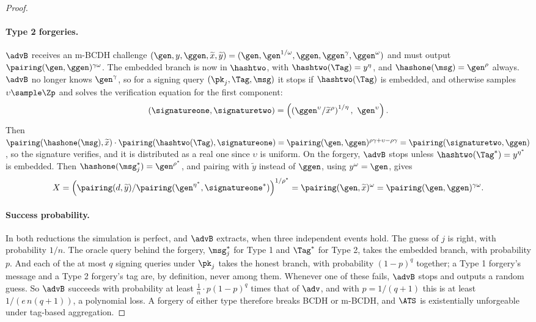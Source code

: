 \begin{proof}
  \paragraph{Type 2 forgeries.} $\advB$ receives an m-BCDH challenge $(\gen, y,
\ggen, \widetilde{x}, \widetilde{y}) = (\gen, \gen^{1/\omega}, \ggen,
\ggen^\gamma, \ggen^\omega)$ and must output $\pairing(\gen,
\ggen)^{\gamma\omega}$. The embedded branch is now in $\hashtwo$, with
$\hashtwo(\Tag) = y^\eta$, and $\hashone(\msg) = \gen^\rho$ always. $\advB$ no longer
knows $\gen^\gamma$, so for a signing query $(\pk_j, \Tag, \msg)$ it stops if
$\hashtwo(\Tag)$ is embedded, and otherwise samples $\upsilon \sample \Zp$ and
solves the verification equation for the first component:
%
\begin{equation*}
  (\signatureone, \signaturetwo) = \left(\left(\ggen^\upsilon /
\widetilde{x}^\rho\right)^{1/\eta}, \ \gen^\upsilon\right).
\end{equation*}
%
Then $\pairing(\hashone(\msg), \widetilde{x}) \cdot \pairing(\hashtwo(\Tag),
\signatureone) = \pairing(\gen, \ggen)^{\rho\gamma + \upsilon - \rho\gamma} =
\pairing(\signaturetwo, \ggen)$, so the signature verifies, and it is distributed
as a real one since $\upsilon$ is uniform. On the forgery, $\advB$ stops unless
$\hashtwo(\Tag^*) = y^{\eta^*}$ is embedded. Then $\hashone(\msg^*_j) =
\gen^{\rho^*}$, and pairing with $\widetilde{y}$ instead of $\ggen$, using
$y^\omega = \gen$, gives
%
\begin{equation*}
  X = \left(\pairing(d, \widetilde{y}) / \pairing(\gen^{\eta^*},
\signatureone^*)\right)^{1/\rho^*} = \pairing(\gen, \widetilde{x})^{\omega} =
\pairing(\gen, \ggen)^{\gamma\omega}.
\end{equation*}

  \paragraph{Success probability.} In both reductions the simulation is perfect,
and $\advB$ extracts, when three independent events hold. The guess of $j$ is
right, with probability $1/n$. The oracle query behind the forgery, $\msg^*_j$ for
Type 1 and $\Tag^*$ for Type 2, takes the embedded branch, with probability $p$.
And each of the at most $q$ signing queries under $\pk_j$ takes the honest branch,
with probability $(1-p)^q$ together; a Type 1 forgery's message and a Type 2
forgery's tag are, by definition, never among them. Whenever one of these fails,
$\advB$ stops and outputs a random guess. So $\advB$ succeeds with probability at
least $\frac{1}{n} \cdot p(1-p)^q$ times that of $\adv$, and with $p = 1/(q+1)$
this is at least $1/(e\,n(q+1))$, a polynomial loss. A forgery of either type
therefore breaks BCDH or m-BCDH, and $\ATS$ is existentially unforgeable under
tag-based aggregation.


\end{proof}
